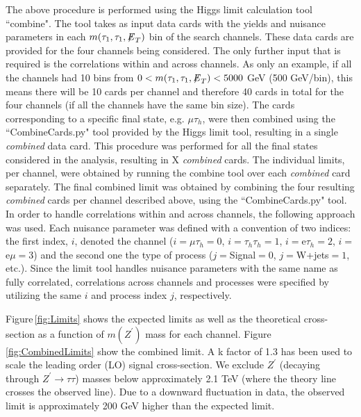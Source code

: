 The above procedure is performed using the Higgs limit calculation tool ``combine". The tool takes as input data cards with the yields and nuisance parameters in 
each $m(\tau_{1},\tau_{1},{\not\mathrel{E}}_T)$ bin of the search channels. These data cards are provided for the four channels being considered. The only further input that 
is required is the correlations within and across channels. As only an example, if all the channels had 10 bins from $0 < m(\tau_{1},\tau_{1},{\not\mathrel{E}}_T) < 5000$ GeV 
(500 GeV/bin), this means there will be 10 cards per channel and therefore 40 cards in total for the four channels (if all the channels have the same bin size).
The cards corresponding to a specific final state, e.g. $\mu\tau_{h}$, were then combined using the ``CombineCards.py" tool provided by the Higgs limit tool, 
resulting in a single \textit{combined} data card. This procedure was performed for all the final states considered in the analysis, resulting in 
X \textit{combined} cards. The individual limits, per channel, were obtained by running the combine tool over each \textit{combined} card separately. The final 
combined limit was obtained by combining the four resulting \textit{combined} cards per channel described above, using the ``CombineCards.py" tool. In order to 
handle correlations within and across channels, the following approach was used. Each nuisance parameter was defined with a convention of two indices: the first 
index, $i$, denoted the channel ($i=\mu\tau_{h}=0$, $i=\tau_{h}\tau_{h}=1$, $i=$e$\tau_{h}=2$, $i=$e$\mu=3$) and the second one the type of process 
($j=$Signal$=0$, $j=$W+jets$=1$, etc.). Since the limit tool handles nuisance parameters with the same name as fully correlated, correlations across channels and 
processes were specified by utilizing the same $i$ and process index $j$, respectively.

Figure\,\ref{fig:Limits} shows the expected limits as well as the theoretical cross-section as a function of $m(Z^{\prime})$ mass for each channel. 
Figure\,\ref{fig:CombinedLimits} show the combined limit. A k factor of 1.3 has been used to scale the leading order (LO) signal cross-section. 
We exclude $Z^{\prime}$ (decaying through $Z^{\prime}\to\tau\tau$) masses below approximately 2.1 TeV (where the theory line crosses the observed line). Due to a downward fluctuation in data, the observed limit is approximately 200 GeV higher than the expected limit.

